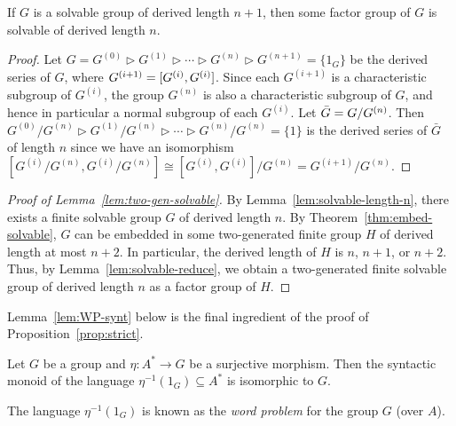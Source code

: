 \begin{lemma}\label{lem:solvable-reduce}
  If \(G\) is a solvable group of derived length \(n + 1\), then some factor group of \(G\) is solvable of derived length \(n\).
\end{lemma}
\begin{proof}
  Let \(G = G^{(0)} \rhd G^{(1)} \rhd \dotsb \rhd G^{(n)} \rhd G^{(n + 1)} = \{1_G\}\) be the derived series of \(G\),
  where \(G^{(i + 1)} = [G^{(i)}, G^{(i)}]\).
  Since each \(G^{(i + 1)}\) is a characteristic subgroup of \(G^{(i)}\), the group \(G^{(n)}\) is also a characteristic subgroup of \(G\),
  and hence in particular a normal subgroup of each \(G^{(i)}\).
  Let \(\bar{G} = G / G^{(n)}\).
  Then \(G^{(0)} / G^{(n)} \rhd G^{(1)} / G^{(n)} \rhd \dotsb \rhd G^{(n)} / G^{(n)} = \{1\}\) is the derived series of \(\bar{G}\) of length \(n\)
  since we have an isomorphism \([G^{(i)} / G^{(n)}, G^{(i)} / G^{(n)}] \cong [G^{(i)}, G^{(i)}] / G^{(n)} = G^{(i + 1)} / G^{(n)}\).
\end{proof}

\begin{proof}[Proof of Lemma~\ref{lem:two-gen-solvable}]
  By Lemma~\ref{lem:solvable-length-n}, there exists a finite solvable group \(G\) of derived length \(n\).
  By Theorem~\ref{thm:embed-solvable},
  \(G\) can be embedded in some two-generated finite group \(H\) of derived length at most \(n + 2\).
  In particular, the derived length of \(H\) is \(n\), \(n + 1\), or \(n + 2\).
  Thus, by Lemma~\ref{lem:solvable-reduce},
  we obtain a two-generated finite solvable group of derived length \(n\) as a factor group of \(H\).
\end{proof}

Lemma~\ref{lem:WP-synt} below is the final ingredient of the proof of Proposition~\ref{prop:strict}.
\begin{lemma}\label{lem:WP-synt}
  Let \(G\) be a group and \(\eta\colon A^* \to G\) be a surjective morphism.
  Then the syntactic monoid of the language \(\eta^{-1}(1_G) \subseteq A^*\) is isomorphic to \(G\).
\end{lemma}
The language \(\eta^{-1}(1_G)\) is known as the \emph{word problem} for the group \(G\) (over \(A\)).

